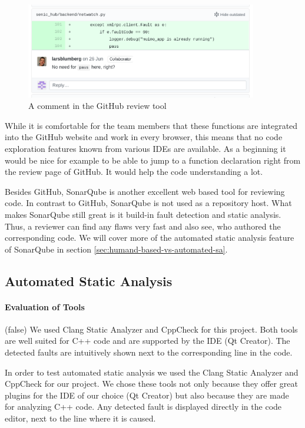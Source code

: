 \documentclass{scrartcl}
\begin{document}
\begin{figure}[h]
	\centering
	\includegraphics[width=0.9\textwidth]{img/github_review_comment}
	\caption[GitHub Review Comment]{A comment in the GitHub review tool}
	\label{fig:github_review_comment}
\end{figure}

While it is comfortable for the team members that these functions are integrated into the GitHub website and work in every browser, this means that no code exploration features known from various IDEs are available. As a beginning it would be nice for example to be able to jump to a function declaration right from the review page of GitHub. It would help the code understanding a lot.

Besides GitHub, SonarQube is another excellent web based tool for reviewing code. In contrast to GitHub, SonarQube is not used as a repository host. What makes SonarQube still great is it build-in fault detection and static analysis. Thus, a reviewer can find any flaws very fast and also see, who authored the corresponding code. We will cover more of the automated static analysis feature of SonarQube in section \ref{sec:humand-based-vs-automated-sa}.

\subsection{Automated Static Analysis}

\paragraph{Evaluation of Tools}

\if(false)
We used Clang Static Analyzer and CppCheck for this project.
Both tools are well suited for C++ code and are supported by the IDE (Qt Creator). The detected faults are intuitively shown next to the corresponding line in the code.
\fi

In order to test automated static analysis we used the Clang Static Analyzer and CppCheck for our project. We chose these tools not only because they offer great plugins for the IDE of our choice (Qt Creator) but also because they are made for analyzing C++ code. Any detected fault is displayed directly in the code editor, next to the line where it is caused. 
\end{document}
